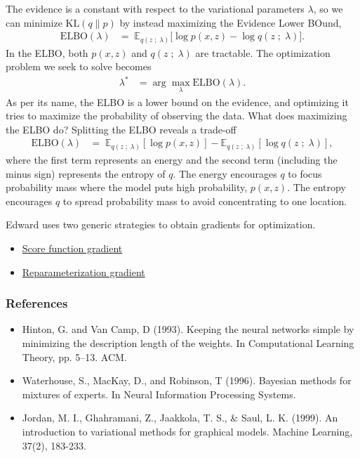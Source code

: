The evidence is a constant with respect to the variational parameters $\lambda$,
so we can minimize $\text{KL}(q\|p)$ by instead maximizing
the Evidence Lower BOund,
\begin{align*}
  \text{ELBO}(\lambda)
  &=\;
  \mathbb{E}_{q(z\;;\;\lambda)}
  \big[
  \log p(x, z)
  -
  \log q(z\;;\;\lambda)
  \big].
\end{align*}
In the ELBO, both $p(x,z)$ and $q(z\;;\;\lambda)$ are
tractable. The optimization problem we seek to solve becomes
\begin{align*}
  \lambda^*
  &=
  \arg \max_\lambda \text{ELBO}(\lambda).
\end{align*}
As per its name, the ELBO is a lower bound on the evidence, and
optimizing it tries to maximize the probability of observing the data.
What does maximizing the ELBO do? Splitting the ELBO reveals a trade-off
\begin{align*}
  \text{ELBO}(\lambda)
  &=\;
  \mathbb{E}_{q(z \;;\; \lambda)}[\log p(x, z)]
  - \mathbb{E}_{q(z \;;\; \lambda)}[\log q(z\;;\;\lambda)],
\end{align*}
where the first term represents an energy and the second term
(including the minus sign) represents the entropy of $q$.
The energy encourages $q$ to focus probability mass where the
model puts high probability, $p(x, z)$.
The entropy encourages $q$ to spread probability mass to avoid
concentrating to one location.

Edward uses two generic strategies to obtain gradients for
optimization.
\begin{itemize}
    \item \href{tut_KLqp_score}{Score function gradient}
    \item \href{tut_KLqp_reparam}{Reparameterization gradient}
  \end{itemize}

\subsubsection{References}\label{references}

\begin{itemize}
\item
  Hinton, G. and Van Camp, D (1993). Keeping the neural networks
  simple by minimizing the description length of the weights. In
  Computational Learning Theory, pp. 5–13. ACM.
\item
  Waterhouse, S., MacKay, D., and Robinson, T (1996). Bayesian methods
  for mixtures of experts. In Neural Information Processing Systems.
\item
  Jordan, M. I., Ghahramani, Z., Jaakkola, T. S., & Saul, L. K.
  (1999). An introduction to variational methods for graphical models.
  Machine Learning, 37(2), 183-233.
\end{itemize}
